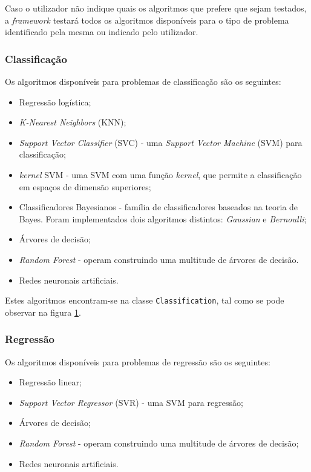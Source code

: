 \documentclass[a4paper]{report}
\begin{document}
{		Caso o utilizador não indique quais os algoritmos que prefere que sejam testados, a \textit{framework} testará todos os algoritmos disponíveis para o tipo de problema identificado pela mesma ou indicado pelo utilizador.
            
			\subsubsection{Classificação} \label{sssec:Classification1}
			Os algoritmos disponíveis para problemas de classificação são os seguintes:
			\begin{itemize}
				\item Regressão logística;
				\item \textit{K-Nearest Neighbors} (KNN);
				\item \textit{Support Vector Classifier} (SVC) - uma \textit{Support Vector Machine} (SVM) para classificação;
				\item \textit{kernel} SVM - uma SVM com uma função \textit{kernel}, que permite a classificação em espaços de dimensão superiores;
				\item Classificadores Bayesianos - família de classificadores baseados na teoria de Bayes. Foram implementados dois algoritmos distintos: \textit{Gaussian} e \textit{Bernoulli};
				\item Árvores de decisão;
				\item \textit{Random Forest} - operam construindo uma multitude de árvores de decisão.
				\item Redes neuronais artificiais.
			\end{itemize}

			Estes algoritmos encontram-se na classe \texttt{Classification}, tal como se pode observar na figura \hyperref[fig:1]{1}.

			\subsubsection{Regressão} \label{sssec:Regression1}
			Os algoritmos disponíveis para problemas de regressão são os seguintes:
			\begin{itemize}
				\item Regressão linear;
				\item \textit{Support Vector Regressor} (SVR) - uma SVM para regressão;
				\item Árvores de decisão;
				\item \textit{Random Forest} - operam construindo uma multitude de árvores de decisão;
				\item Redes neuronais artificiais.
			\end{itemize}

}
\end{document}
